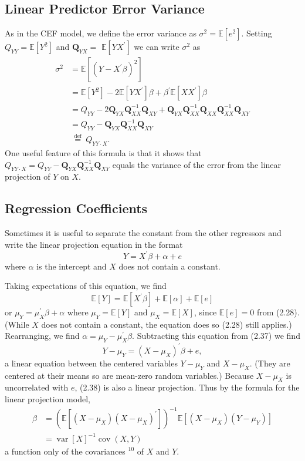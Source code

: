 \documentclass[10pt]{article}
\begin{document}
\subsection{Linear Predictor Error Variance}
As in the CEF model, we define the error variance as $\sigma^{2}=\mathbb{E}\left[e^{2}\right]$. Setting $Q_{Y Y}=\mathbb{E}\left[Y^{2}\right]$ and $\boldsymbol{Q}_{Y X}=$ $\mathbb{E}\left[Y X^{\prime}\right]$ we can write $\sigma^{2}$ as
$$
\begin{aligned}
\sigma^{2} &=\mathbb{E}\left[\left(Y-X^{\prime} \beta\right)^{2}\right] \\
&=\mathbb{E}\left[Y^{2}\right]-2 \mathbb{E}\left[Y X^{\prime}\right] \beta+\beta^{\prime} \mathbb{E}\left[X X^{\prime}\right] \beta \\
&=Q_{Y Y}-2 \boldsymbol{Q}_{Y X} \boldsymbol{Q}_{X X}^{-1} \boldsymbol{Q}_{X Y}+\boldsymbol{Q}_{Y X} \boldsymbol{Q}_{X X}^{-1} \boldsymbol{Q}_{X X} \boldsymbol{Q}_{X X}^{-1} \boldsymbol{Q}_{X Y} \\
&=Q_{Y Y}-\boldsymbol{Q}_{Y X} \boldsymbol{Q}_{X X}^{-1} \boldsymbol{Q}_{X Y} \\
& \stackrel{\text { def }}{=} Q_{Y Y \cdot X} .
\end{aligned}
$$
One useful feature of this formula is that it shows that $Q_{Y Y \cdot X}=Q_{Y Y}-\boldsymbol{Q}_{Y X} \boldsymbol{Q}_{X X}^{-1} \boldsymbol{Q}_{X Y}$ equals the variance of the error from the linear projection of $Y$ on $X$.

\subsection{Regression Coefficients}
Sometimes it is useful to separate the constant from the other regressors and write the linear projection equation in the format
$$
Y=X^{\prime} \beta+\alpha+e
$$
where $\alpha$ is the intercept and $X$ does not contain a constant.

Taking expectations of this equation, we find
$$
\mathbb{E}[Y]=\mathbb{E}\left[X^{\prime} \beta\right]+\mathbb{E}[\alpha]+\mathbb{E}[e]
$$
or $\mu_{Y}=\mu_{X}^{\prime} \beta+\alpha$ where $\mu_{Y}=\mathbb{E}[Y]$ and $\mu_{X}=\mathbb{E}[X]$, since $\mathbb{E}[e]=0$ from (2.28). (While $X$ does not contain a constant, the equation does so (2.28) still applies.) Rearranging, we find $\alpha=\mu_{Y}-\mu_{X}^{\prime} \beta$. Subtracting this equation from (2.37) we find
$$
Y-\mu_{Y}=\left(X-\mu_{X}\right)^{\prime} \beta+e,
$$
a linear equation between the centered variables $Y-\mu_{Y}$ and $X-\mu_{X}$. (They are centered at their means so are mean-zero random variables.) Because $X-\mu_{X}$ is uncorrelated with $e$, (2.38) is also a linear projection. Thus by the formula for the linear projection model,
$$
\begin{aligned}
\beta &=\left(\mathbb{E}\left[\left(X-\mu_{X}\right)\left(X-\mu_{X}\right)^{\prime}\right]\right)^{-1} \mathbb{E}\left[\left(X-\mu_{X}\right)\left(Y-\mu_{Y}\right)\right] \\
&=\operatorname{var}[X]^{-1} \operatorname{cov}(X, Y)
\end{aligned}
$$
a function only of the covariances ${ }^{10}$ of $X$ and $Y$.
\end{document}

